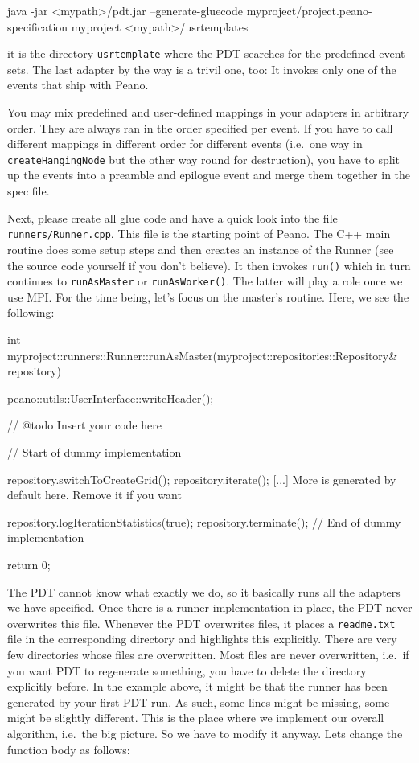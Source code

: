 \begin{code}
java -jar <mypath>/pdt.jar --generate-gluecode
myproject/project.peano-specification myproject <mypath>/usrtemplates
\end{code}

\noindent
it is the directory \texttt{usrtemplate} where the PDT searches for the
predefined event sets.
The last adapter by the way is a trivil one, too: It invokes only one of the
events that ship with Peano.

\begin{remark}
You may mix predefined and user-defined mappings in your adapters in arbitrary
order. 
They are always ran in the order specified per event.
If you have to call different mappings in different order for different events
(i.e.~one way in \texttt{createHangingNode} but the other way round for
destruction), you have to split up the events into a preamble and epilogue event
and merge them together in the spec file.
\end{remark}

\noindent
Next, please create all glue code and have a quick look into the file
\texttt{runners/Runner.cpp}.
This file is the starting point of Peano.
The C++ main routine does some setup steps and then creates an instance of the
Runner (see the source code yourself if you don't believe).
It then invokes \texttt{run()} which in turn continues to \texttt{runAsMaster}
or \texttt{runAsWorker()}.
The latter will play a role once we use MPI.
For the time being, let's focus on the master's routine.
Here, we see the following:

\begin{code}
int myproject::runners::Runner::runAsMaster(myproject::repositories::Repository& repository) {
  peano::utils::UserInterface::writeHeader();

  // @todo Insert your code here
  
  // Start of dummy implementation
  
  repository.switchToCreateGrid(); repository.iterate();
  [...] More is generated by default here. Remove it if you want
 
  repository.logIterationStatistics(true);
  repository.terminate();
  // End of dummy implementation

  return 0;
}
\end{code}

\noindent
The PDT cannot know what exactly we do, so it basically runs all the adapters we
have specified.
Once there is a runner implementation in place, the PDT never overwrites this
file.
Whenever the PDT overwrites files, it places a \texttt{readme.txt} file in the
corresponding directory and highlights this explicitly.
There are very few directories whose files are overwritten.
Most files are never overwritten, i.e.~if you want PDT to regenerate something,
you have to delete the directory explicitly before.
In the example above, it might be that the runner has been generated by your
first PDT run.
As such, some lines might be missing, some might be slightly different.
This is the place where we implement our overall algorithm,
i.e.~the big picture.
So we have to modify it anyway.
Lets change the function body as follows:

